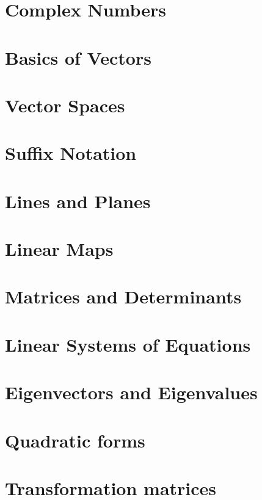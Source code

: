 \documentclass[british,11pt,a4paper]{report}
\begin{document}
\maketitle
\tableofcontents
\chapter{Complex Numbers} %

\chapter{Basics of Vectors} %
\chapter{Vector Spaces} %
\chapter{Suffix Notation} %
\chapter{Lines and Planes} %
\chapter{Linear Maps} %
\chapter{Matrices and Determinants} %
\chapter{Linear Systems of Equations} %
\chapter{Eigenvectors and Eigenvalues} %

\chapter{Quadratic forms}
\chapter{Transformation matrices}

\end{document}
